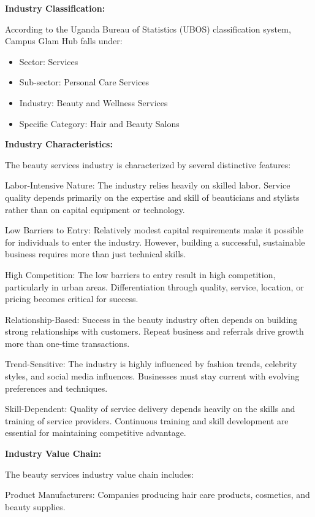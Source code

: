 \documentclass[a4paper,12pt]{article}
\begin{document}
\textbf{Industry Classification:}

According to the Uganda Bureau of Statistics (UBOS) classification system, Campus Glam Hub falls under:
\begin{itemize}[leftmargin=2em]
    \item Sector: Services
    \item Sub-sector: Personal Care Services
    \item Industry: Beauty and Wellness Services
    \item Specific Category: Hair and Beauty Salons
\end{itemize}

\textbf{Industry Characteristics:}

The beauty services industry is characterized by several distinctive features:

Labor-Intensive Nature: The industry relies heavily on skilled labor. Service quality depends primarily on the expertise and skill of beauticians and stylists rather than on capital equipment or technology.

Low Barriers to Entry: Relatively modest capital requirements make it possible for individuals to enter the industry. However, building a successful, sustainable business requires more than just technical skills.

High Competition: The low barriers to entry result in high competition, particularly in urban areas. Differentiation through quality, service, location, or pricing becomes critical for success.

Relationship-Based: Success in the beauty industry often depends on building strong relationships with customers. Repeat business and referrals drive growth more than one-time transactions.

Trend-Sensitive: The industry is highly influenced by fashion trends, celebrity styles, and social media influences. Businesses must stay current with evolving preferences and techniques.

Skill-Dependent: Quality of service delivery depends heavily on the skills and training of service providers. Continuous training and skill development are essential for maintaining competitive advantage.

\textbf{Industry Value Chain:}

The beauty services industry value chain includes:

Product Manufacturers: Companies producing hair care products, cosmetics, and beauty supplies.
\end{document}
